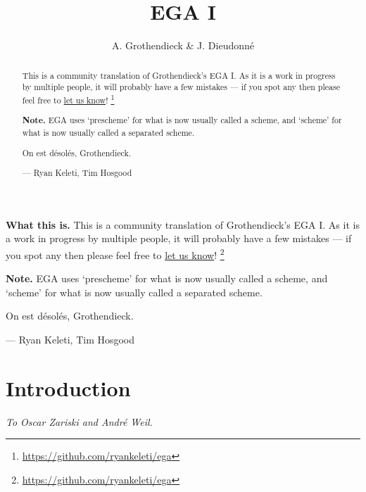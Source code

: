 \documentclass{book}
\title{EGA I}
\author{A. Grothendieck \& J. Dieudonn{\'e}}
\begin{document}
\ifplastex
\textbf{What this is.}
    This is a community translation of Grothendieck's EGA I.
    As it is a work in progress by multiple people, it will probably have a few
    mistakes --- if you spot any then please feel free to
    \href{https://github.com/ryankeleti/ega/issues}{let us know}!
    \thanks{\url{https://github.com/ryankeleti/ega}}

\noindent
    \textbf{Note.} EGA uses `prescheme' for what is now usually called
    a scheme, and `scheme' for what is now usually called a
    separated scheme.
 
    On est d{\'e}sol{\'e}s, Grothendieck.

    --- Ryan Keleti, Tim Hosgood

\else

\renewcommand{\abstractname}{What this is}
\begin{abstract}
    This is a community translation of Grothendieck's EGA I.
    As it is a work in progress by multiple people, it will probably have a few
    mistakes --- if you spot any then please feel free to
    \href{https://github.com/ryankeleti/ega/issues}{let us know}!
    \thanks{\url{https://github.com/ryankeleti/ega}}

\noindent
    \textbf{Note.} EGA uses `prescheme' for what is now usually called
    a scheme, and `scheme' for what is now usually called a
    separated scheme.
 
    On est d{\'e}sol{\'e}s, Grothendieck.

    --- Ryan Keleti, Tim Hosgood
\end{abstract}

\fi

\maketitle


{
  \tableofcontents{}
}

\clearpage

\part*{Introduction}
\label{intro-section}

\begin{flushright}
\emph{To Oscar Zariski and Andr\'e Weil.}
\end{flushright}
\medskip
\end{document}
